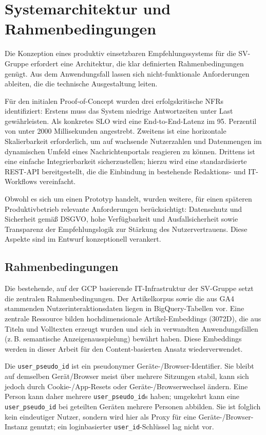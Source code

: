 \section{Systemarchitektur und Rahmenbedingungen}
Die Konzeption eines produktiv einsetzbaren Empfehlungssystems für die SV-Gruppe erfordert eine Architektur, die klar definierten Rahmenbedingungen genügt. Aus dem Anwendungsfall lassen sich nicht-funktionale Anforderungen ableiten, die die technische Ausgestaltung leiten.
\label{sec:nfr}

Für den initialen Proof-of-Concept wurden drei erfolgskritische \ac{NFR}s identifiziert:
Erstens muss das System niedrige Antwortzeiten unter Last gewährleisten. Als konkretes \ac{SLO} wird eine End-to-End-Latenz im 95. Perzentil von unter 2000 Millisekunden angestrebt.
Zweitens ist eine horizontale Skalierbarkeit erforderlich, um auf wachsende Nutzerzahlen und Datenmengen im dynamischen Umfeld eines Nachrichtenportals reagieren zu können.
Drittens ist eine einfache Integrierbarkeit sicherzustellen; hierzu wird eine standardisierte REST-API bereitgestellt, die die Einbindung in bestehende Redaktions- und IT-Workflows vereinfacht.


Obwohl es sich um einen Prototyp handelt, wurden weitere, für einen späteren Produktivbetrieb relevante Anforderungen berücksichtigt: Datenschutz und Sicherheit gemäß \ac{DSGVO}, hohe Verfügbarkeit und Ausfallsicherheit sowie Transparenz der Empfehlungslogik zur Stärkung des Nutzervertrauens. Diese Aspekte sind im Entwurf konzeptionell verankert.

\subsection{Rahmenbedingungen}
Die bestehende, auf der \ac{GCP} basierende IT-Infrastruktur der SV-Gruppe setzt die zentralen Rahmenbedingungen. Der Artikelkorpus sowie die aus \ac{GA4} stammenden Nutzerinteraktionsdaten liegen in BigQuery-Tabellen vor. Eine zentrale Ressource bilden hochdimensionale Artikel-Embeddings (3072D), die aus Titeln und Volltexten erzeugt wurden und sich in verwandten Anwendungsfällen (z.\,B. semantische Anzeigenausspielung) bewährt haben. Diese Embeddings werden in dieser Arbeit für den Content-basierten Ansatz wiederverwendet.

Die \texttt{user\_pseudo\_id} ist ein pseudonymer Geräte-/Browser-Identifier. Sie bleibt auf demselben Gerät/Browser meist über mehrere Sitzungen stabil, kann sich jedoch durch Cookie-/App-Resets oder Geräte-/Browserwechsel ändern. Eine Person kann daher mehrere \texttt{user\_pseudo\_id}s haben; umgekehrt kann eine \texttt{user\_pseudo\_id} bei geteilten Geräten mehrere Personen abbilden. Sie ist folglich kein eindeutiger Nutzer, sondern wird hier als Proxy für eine Geräte-/Browser-Instanz genutzt; ein loginbasierter \texttt{user\_id}-Schlüssel lag nicht vor.

